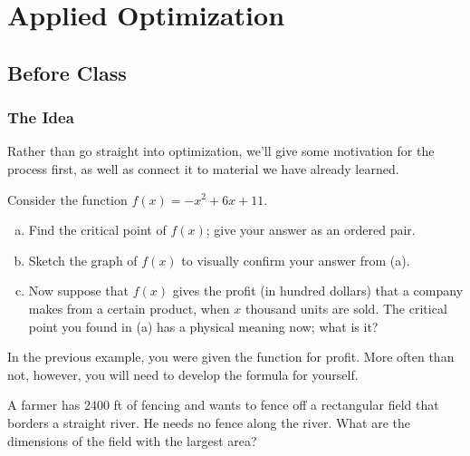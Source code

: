 \documentclass[notes]{subfiles}
\begin{document}
	\setcounter{section}{6}
	\fancyhead[LO,RE]{\bfseries \small \currentname}
	\fancyfoot[C]{{}}
	\fancyfoot[LO,RE]{\large \thepage}	%
	
\section*{Applied Optimization}\label{cs47}
	\subsection*{Before Class}
	\subsubsection*{The Idea}
		Rather than go straight into optimization, we'll give some motivation for the process first, as well as connect it to material we have already learned.
		\begin{ex}
			Consider the function \(f(x) = -x^2 + 6x + 11\).
			\begin{enumerate}[(a)]
				\item Find the critical point of \(f(x)\); give your answer as an ordered pair.
					
				\item Sketch the graph of \(f(x)\) to visually confirm your answer from (a).
					
				\item Now suppose that \(f(x)\) gives the profit (in hundred dollars) that a company makes from a certain product, when \(x\) thousand units are sold.  The critical point you found in (a) has a physical meaning now; what is it?
			\end{enumerate}
		\end{ex}
			\newpage
		
		In the previous example, you were given the function for profit.  More often than not, however, you will need to develop the formula for yourself.  		
		\begin{ex}
			 A farmer has 2400 ft of fencing and wants to fence off a rectangular field that borders a straight river.  He needs no fence along the river.  What are the dimensions of the field with the largest area?
		\end{ex}
			\vs{1}
			\newpage
			
\end{document}
